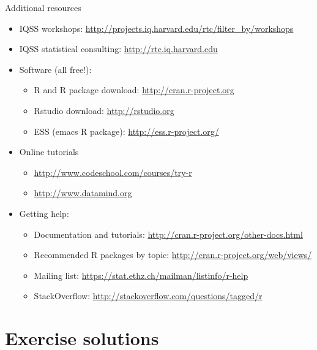 \documentclass[table,smaller]{beamer}
\begin{document}
\begin{frame}[label=sec-8-2]{Additional resources}
\begin{itemize}
\item IQSS workshops: \url{http://projects.iq.harvard.edu/rtc/filter_by/workshops}

\item IQSS statistical consulting: \url{http://rtc.iq.harvard.edu}

\item Software (all free!):
\begin{itemize}
\item R and R package download: \url{http://cran.r-project.org}
\item Rstudio download: \url{http://rstudio.org}
\item ESS (emacs R package): \url{http://ess.r-project.org/}
\end{itemize}

\item Online tutorials
\begin{itemize}
\item \url{http://www.codeschool.com/courses/try-r}
\item \url{http://www.datamind.org}
\end{itemize}

\item Getting help:
\begin{itemize}
\item Documentation and tutorials: \url{http://cran.r-project.org/other-docs.html}
\item Recommended R packages by topic: \url{http://cran.r-project.org/web/views/}
\item Mailing list: \url{https://stat.ethz.ch/mailman/listinfo/r-help}
\item StackOverflow: \url{http://stackoverflow.com/questions/tagged/r}
\end{itemize}
\end{itemize}
\end{frame}


\section{Exercise solutions}
\label{sec-9}
\end{document}
